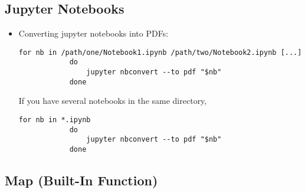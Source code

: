 \documentclass[12pt, a4paper]{article}
\numberwithin{equation}{section}
\theoremstyle{definition}
\theoremstyle{definition}
\begin{document}
	\subsection{Jupyter Notebooks}
	\begin{itemize}
		\item Converting jupyter notebooks into PDFs:
		
		\begin{lstlisting}[style=mystylepython, label=alg:notebooks_to_pdf, xleftmargin=\parindent]
			for nb in /path/one/Notebook1.ipynb /path/two/Notebook2.ipynb [...]
			do
				jupyter nbconvert --to pdf "$nb"
			done 
		\end{lstlisting}
	
		If you have several notebooks in the same directory, 
		\begin{lstlisting}[style=mystylepython, label=alg:notebooks_to_pdf__wildcard, xleftmargin=\parindent]
			for nb in *.ipynb
			do
				jupyter nbconvert --to pdf "$nb"
			done 
		\end{lstlisting}
		
	\end{itemize}
	
	\subsection{Map (Built-In Function)}
	
\end{document}
